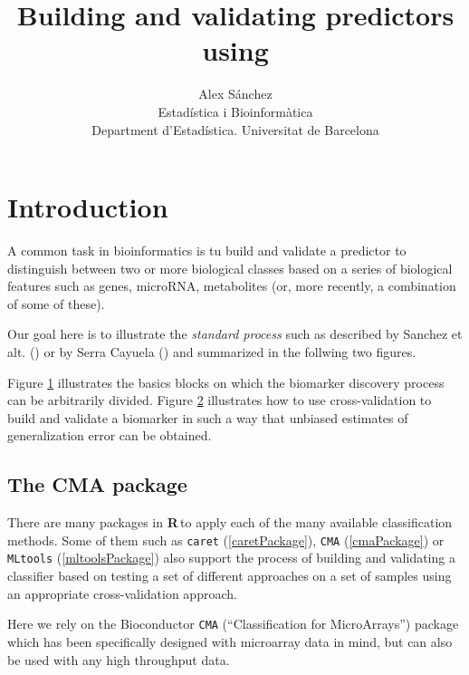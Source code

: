 \documentclass{article}\usepackage[]{graphicx}\usepackage[]{color}
\title{Building and validating predictors using \R}
\author{Alex Sánchez\\
Estad\'istica i Bioinform\`atica\\
Department d'Estadística. Universitat de Barcelona}
\newcommand{\R}{\textbf{R}\,}
\begin{document}

\section{Introduction}

A common task in bioinformatics is tu build and validate a predictor
to distinguish between two or more biological classes based on a
series of biological features such as genes, microRNA, metabolites (or,
more recently, a combination of some of these).

Our goal here is to illustrate the \emph{standard process} such as
described by Sanchez et alt. (\cite{Sanchez2013}) or by Serra Cayuela (\cite{SerraCayuela2015}) and summarized
in the follwing two figures.

Figure \ref{workflow} illustrates the basics blocks on which the biomarker discovery process can be arbitrarily divided. Figure \ref{validation} illustrates how to use cross-validation to build and validate a biomarker in such a way that unbiased estimates of generalization error can be obtained.

\begin{figure}
\label{workflow}
\end{figure}


\begin{figure}
\label{validation}
\end{figure}

\subsection{The CMA package}

There are many packages in \R to apply each of the many available
classification methods.  Some of them such as \texttt{caret}
(\ref{caretPackage}), \texttt{CMA} (\ref{cmaPackage}) or
\texttt{MLtools} (\ref{mltoolsPackage}) also support the process of
building and validating a classifier based on testing a set of
different approaches on a set of samples using an appropriate
cross-validation approach. 

Here we rely on the Bioconductor \texttt{CMA} (``Classification for MicroArrays'') package which has been
specifically designed with microarray data in mind, but can also be used with any high throughput data.
\end{document}
